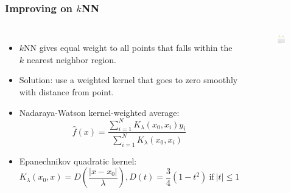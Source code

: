 \documentclass[aspectratio=169]{beamer}
\begin{document}
\begin{frame}
\frametitle{Improving on $k$NN}
\begin{columns}
    \begin{itemize}
        \item $k$NN gives equal weight to all points that falls within the $k$ nearest neighbor region.
        \item Solution: use a weighted kernel that goes to zero smoothly with distance from point.
        \item Nadaraya-Watson kernel-weighted average:
        \begin{equation*}
            \hat{f}(x) = \frac{\sum_{i=1}^N K_{\lambda}(x_0,x_i)y_i}{\sum_{i=1}^N K_{\lambda}(x_0,x_i)}
        \end{equation*}
        \item Epanechnikov quadratic kernel:
        \begin{equation*}
            K_{\lambda}(x_0,x) = D(\frac{|x-x_0|}{\lambda}), D(t) = \frac{3}{4}(1-t^2)\mathrm{~if~}|t| \leq 1
        \end{equation*}
    \end{itemize}
\begin{figure}
            \centering
            \includegraphics[width=0.9\textwidth]{figures/epankernel.pdf}
        \end{figure}
\end{columns}
\end{frame}
\end{document}
